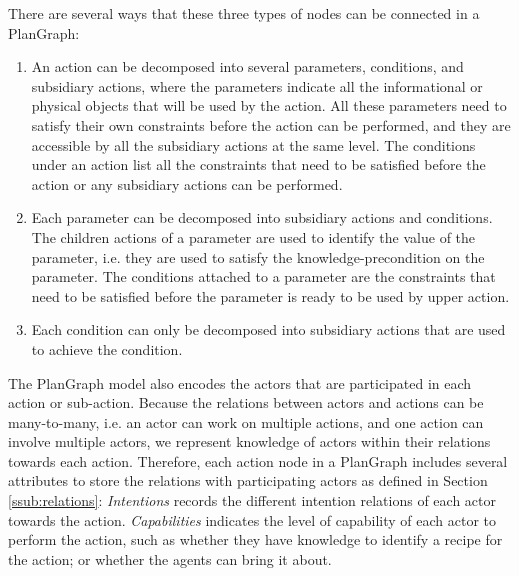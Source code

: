 There are several ways that these three types of nodes can be connected in a PlanGraph:
\begin{enumerate}
	\item An action can be decomposed into several parameters, conditions, and subsidiary actions, where the parameters indicate all the informational or physical objects that will be used by the action. All these parameters need to satisfy their own constraints before the action can be performed, and they are accessible by all the subsidiary actions at the same level. The conditions under an action list all the constraints that need to be satisfied before the action or any subsidiary actions can be performed.  
	\item Each parameter can be decomposed into subsidiary actions and conditions. The children actions of a parameter are used to identify the value of the parameter, i.e. they are used to satisfy the knowledge-precondition on the parameter. The conditions attached to a parameter are the constraints that need to be satisfied before the parameter is ready to be used by upper action.
	\item Each condition can only be decomposed into subsidiary actions that are used to achieve the condition.
\end{enumerate}

The PlanGraph model also encodes the actors that are participated in each action or sub-action. Because the relations between actors and actions can be many-to-many, i.e. an actor can work on multiple actions, and one action can involve multiple actors, we represent knowledge of actors within their relations towards each action. Therefore, each action node in a PlanGraph includes several attributes to store the relations with participating actors as defined in Section \ref{ssub:relations}: \emph{Intentions} records the different intention relations of each actor towards the action. \emph{Capabilities} indicates the level of capability of each actor to perform the action, such as whether they have knowledge to identify a recipe for the action; or whether the agents can bring it about.

